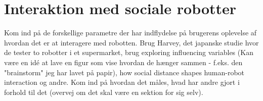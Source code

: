 \section{Interaktion med sociale robotter}
\label{InteraktionSocialeRobotter}
%
Kom ind på de forskellige parametre der har indflydelse på brugerens oplevelse af hvordan det er at interagere med robotten. \blankline
%
Brug Harvey, det japanske studie hvor de tester to robotter i et supermarket, brug exploring influencing variables (Kan være en idé at lave en figur som vise hvordan de hænger sammen - f.eks. den "brainstorm" jeg har lavet på papir), how social distance shapes human-robot interaction og andre. \blankline
%
Kom ind på hvordan det måles, hvad har andre gjort i forhold til det (overvej om det skal være en sektion for sig selv).
